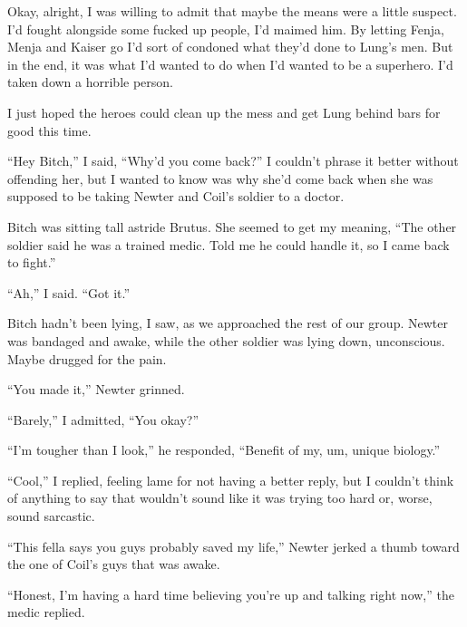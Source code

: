 Okay, alright, I was willing to admit that maybe the means were a little suspect.  I'd fought alongside some fucked up people, I'd maimed him.  By letting Fenja, Menja and Kaiser go I'd sort of condoned what they'd done to Lung's men.  But in the end, it was what I'd wanted to do when I'd wanted to be a superhero.  I'd taken down a horrible person.



I just hoped the heroes could clean up the mess and get Lung behind bars for good this time.



``Hey Bitch,'' I said, ``Why'd you come back?''  I couldn't phrase it better without offending her, but I wanted to know was why she'd come back when she was supposed to be taking Newter and Coil's soldier to a doctor.



Bitch was sitting tall astride Brutus.  She seemed to get my meaning, ``The other soldier said he was a trained medic.  Told me he could handle it, so I came back to fight.''



``Ah,'' I said.  ``Got it.''



Bitch hadn't been lying, I saw, as we approached the rest of our group.  Newter was bandaged and awake, while the other soldier was lying down, unconscious.  Maybe drugged for the pain.



``You made it,'' Newter grinned.



``Barely,'' I admitted, ``You okay?''



``I'm tougher than I look,'' he responded, ``Benefit of my, um, unique biology.''



``Cool,'' I replied, feeling lame for not having a better reply, but I couldn't think of anything to say that wouldn't sound like it was trying too hard or, worse, sound sarcastic.



``This fella says you guys probably saved my life,'' Newter jerked a thumb toward the one of Coil's guys that was awake.



``Honest, I'm having a hard time believing you're up and talking right now,'' the medic replied.



